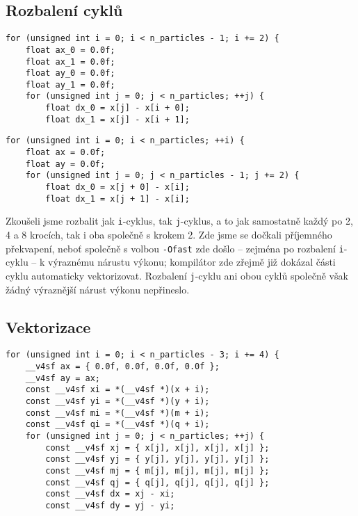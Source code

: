 \documentclass[10pt,a4paper]{article}
\begin{document}
\vspace{10pt}
\subsection{Rozbalení cyklů}
\begin{lstlisting}
for (unsigned int i = 0; i < n_particles - 1; i += 2) {
    float ax_0 = 0.0f;
    float ax_1 = 0.0f;
    float ay_0 = 0.0f;
    float ay_1 = 0.0f;
    for (unsigned int j = 0; j < n_particles; ++j) {
        float dx_0 = x[j] - x[i + 0];
        float dx_1 = x[j] - x[i + 1];
\end{lstlisting}

\begin{lstlisting}
for (unsigned int i = 0; i < n_particles; ++i) {
    float ax = 0.0f;
    float ay = 0.0f;
    for (unsigned int j = 0; j < n_particles - 1; j += 2) {
        float dx_0 = x[j + 0] - x[i];
        float dx_1 = x[j + 1] - x[i];
\end{lstlisting}

Zkoušeli jsme rozbalit jak \texttt{i}-cyklus, tak \texttt{j}-cyklus, a
to jak samostatně každý po 2, 4 a 8 krocích, tak i oba společně s
krokem 2. Zde jsme se dočkali příjemného překvapení, neboť společně s
volbou \texttt{-Ofast} zde došlo -- zejména po rozbalení
\texttt{i}-cyklu -- k výraznému nárustu výkonu; kompilátor zde zřejmě
již dokázal části cyklu automaticky vektorizovat. Rozbalení
\texttt{j}-cyklu ani obou cyklů společně však žádný výraznější nárust
výkonu nepřineslo.

\vspace{10pt}
\subsection{Vektorizace}
\begin{lstlisting}
for (unsigned int i = 0; i < n_particles - 3; i += 4) {
    __v4sf ax = { 0.0f, 0.0f, 0.0f, 0.0f };
    __v4sf ay = ax;
    const __v4sf xi = *(__v4sf *)(x + i);
    const __v4sf yi = *(__v4sf *)(y + i);
    const __v4sf mi = *(__v4sf *)(m + i);
    const __v4sf qi = *(__v4sf *)(q + i);
    for (unsigned int j = 0; j < n_particles; ++j) {
        const __v4sf xj = { x[j], x[j], x[j], x[j] };
        const __v4sf yj = { y[j], y[j], y[j], y[j] };
        const __v4sf mj = { m[j], m[j], m[j], m[j] };
        const __v4sf qj = { q[j], q[j], q[j], q[j] };
        const __v4sf dx = xj - xi;
        const __v4sf dy = yj - yi;
\end{lstlisting}
\end{document}
